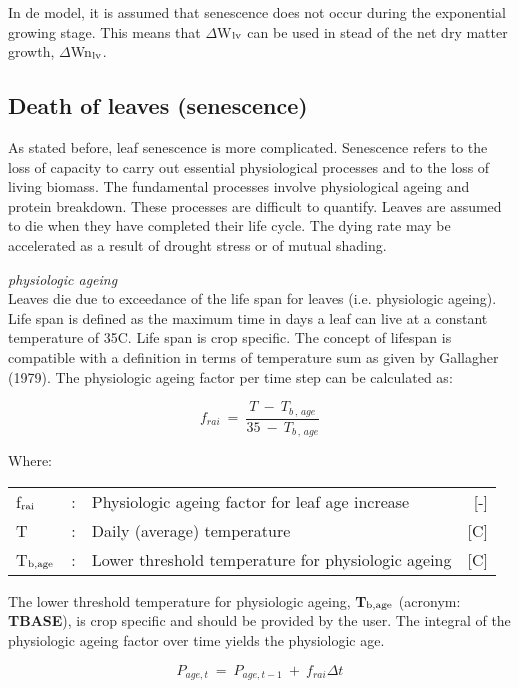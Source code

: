 In de model, it is assumed that senescence does not occur during the exponential growing
stage. This means that $\Delta$W$_{{\rm lv}}$ can be used in stead of the net dry matter growth, $\Delta$Wn$_{{\rm lv}}$.

\subsection{Death of leaves (senescence)}
As stated before, leaf senescence is more complicated. Senescence refers to the loss of
capacity to carry out essential physiological processes and to the loss of living biomass.
The fundamental processes involve physiological ageing and protein breakdown. These
processes are difficult to quantify. Leaves are assumed to die when they have completed
their life cycle. The dying rate may be accelerated as a result of drought stress or of
mutual shading.

{\it physiologic ageing}\\
Leaves die due to exceedance of the life span for leaves (i.e. physiologic ageing). Life
span is defined as the maximum time in days a leaf can live at a constant temperature of
35\degrees C. Life span is crop specific. The concept of lifespan is compatible with a definition
in terms of temperature sum as given by Gallagher (1979).
The physiologic ageing factor per time step can be calculated as:

\begin{equation}
f _{rai} ~=~{\frac{ T~-~T _{b\, ,\, age} }{35~-~ T _{b\, ,\, age} }}
\end{equation}

Where:\\[5pt]
\begin{tabularx}{\textwidth}{llXr}
	f$_{{\rm rai}}$ &:& Physiologic ageing factor for leaf age increase   &
	[-]\\
	T &:& Daily (average) temperature   &
	[\degrees C]\\
	T$_{{\rm b,age}}$ &:& Lower threshold temperature for physiologic ageing   &
	[\degrees C]\\
\end{tabularx}

The lower threshold temperature for physiologic ageing, {\bf T$_{{\rm b,age}}$} (acronym: {\bf TBASE}), is
crop specific and should be provided by the user. The integral of the physiologic ageing
factor over time yields the physiologic age. 

\begin{equation}
\label{eq:5.57}
P _{age,t} ~=~ P _{age,t-1} ~+~f_{rai} \Delta t
\end{equation}

